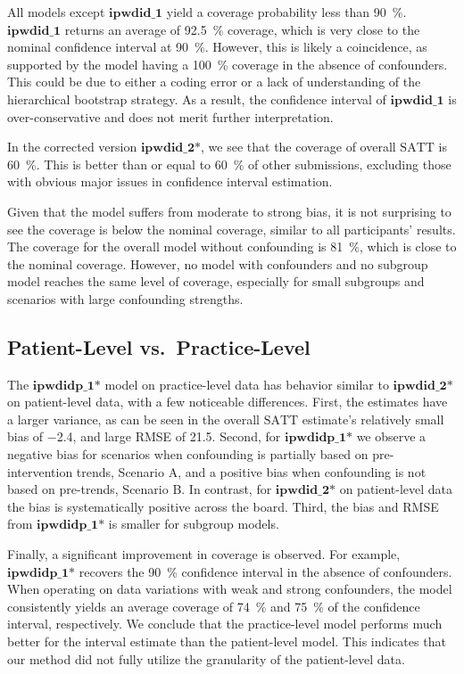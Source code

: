 \documentclass[twoside,11pt]{article}
\newcommand*{\SATT}{\ensuremath{\text{SATT}}\xspace}
\newcommand{\modelStyle}[1]{\ensuremath{\textbf{#1}}\xspace}
\newcommand*{\ipwdid}{\modelStyle{ipwdid\_1}}
\newcommand*{\ipwdidStar}{\modelStyle{ipwdid\_2*}}
\newcommand*{\ipwdidP}{\modelStyle{ipwdidp\_1*}}
\begin{document}
All models except \ipwdid yield a coverage probability less than \SI{90}{\percent}.
\ipwdid returns an average of \SI{92.5}{\percent} coverage,
which is very close to the nominal confidence interval at \SI{90}{\percent}.
However, this is likely a coincidence, as supported by
the model having a \SI{100}{\percent} coverage in the absence of confounders.
This could be due to either a coding error or a lack of understanding of the hierarchical bootstrap strategy.
As a result, the confidence interval of \ipwdid is over-conservative and does not merit further interpretation.

In the corrected version \ipwdidStar, we see that the coverage of overall \SATT is \SI{60}{\percent}.
This is better than or equal to \SI{60}{\percent} of other submissions,
excluding those with obvious major issues in confidence interval estimation.

Given that the model suffers from moderate to strong bias,
it is not surprising to see the coverage is below the nominal coverage,
similar to all participants' results.
The coverage for the overall model without confounding is
\SI{81}{\percent}, which is close to the nominal coverage.
However, no model with confounders and no subgroup model reaches the same level of coverage,
especially for small subgroups and scenarios with large confounding strengths.

\subsection{Patient-Level vs.\ Practice-Level}
\label{results:patient_practice}

The \ipwdidP model on practice-level data has
behavior similar to \ipwdidStar on patient-level data,
with a few noticeable differences.
First, the estimates have a larger variance,
as can be seen in the overall \SATT estimate's relatively small bias of \num{-2.4}, and large RMSE of \num{21.5}.
Second, for \ipwdidP we observe a negative bias for scenarios when confounding is partially based on pre-intervention trends, Scenario A,
and a positive bias when confounding is not based on pre-trends, Scenario B.
In contrast, for \ipwdidStar on patient-level data the bias is systematically positive across the board.
Third, the bias and RMSE from \ipwdidP is smaller for subgroup models.

Finally, a significant improvement in coverage is observed.
For example, \ipwdidP recovers the \SI{90}{\percent} confidence interval in the absence of confounders.
When operating on data variations with weak and strong confounders,
the model consistently yields an average coverage of
\SI{74}{\percent} and \SI{75}{\percent} of the confidence interval, respectively.
We conclude that the practice-level model performs much better
for the interval estimate than the patient-level model.
This indicates that our method did not fully utilize the granularity of the patient-level data.
\end{document}

